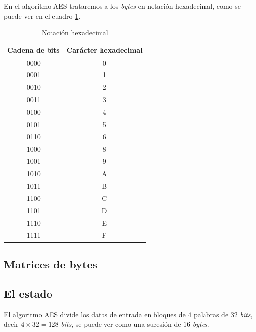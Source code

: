 \documentclass[peerreview]{IEEEtran}
\begin{document}
En el algoritmo AES trataremos a los \textit{bytes} en notación hexadecimal,
como se puede ver en el cuadro \ref{tab:HEX}.
\begin{table}[ht]
  \centering
  \begin{tabular}{|c|c|}
    \hline
    \textbf{Cadena de bits} & \textbf{Carácter hexadecimal} \\ \hline
    0000                    & 0                             \\ \hline
    0001                    & 1                             \\ \hline
    0010                    & 2                             \\ \hline
    0011                    & 3                             \\ \hline
    0100                    & 4                             \\ \hline
    0101                    & 5                             \\ \hline
    0110                    & 6                             \\ \hline
    1000                    & 8                             \\ \hline
    1001                    & 9                             \\ \hline
    1010                    & A                             \\ \hline
    1011                    & B                             \\ \hline
    1100                    & C                             \\ \hline
    1101                    & D                             \\ \hline
    1110                    & E                             \\ \hline
    1111                    & F                             \\ \hline
  \end{tabular}
  \caption{Notación hexadecimal}
  \label{tab:HEX}
\end{table}

\subsection{Matrices de bytes}
\subsection{El estado}
El algoritmo AES divide los datos de entrada en bloques de $4$ palabras de $32$
\textit{bits}, decir $4 \times 32 = 128$ \textit{bits}, se puede ver como una
sucesión de $16$ \textit{bytes}.\\
\end{document}
